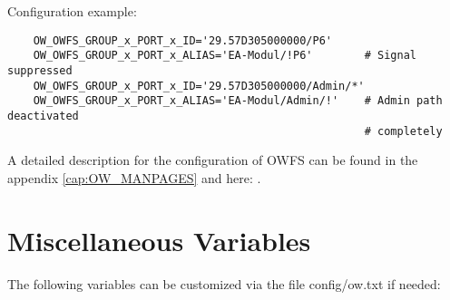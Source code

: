 \begin{description}
Configuration example:
\begin{example}
\begin{verbatim}
    OW_OWFS_GROUP_x_PORT_x_ID='29.57D305000000/P6'
    OW_OWFS_GROUP_x_PORT_x_ALIAS='EA-Modul/!P6'        # Signal suppressed
    OW_OWFS_GROUP_x_PORT_x_ID='29.57D305000000/Admin/*'
    OW_OWFS_GROUP_x_PORT_x_ALIAS='EA-Modul/Admin/!'    # Admin path deactivated
                                                       # completely
\end{verbatim}
\end{example}

A detailed description for the configuration of OWFS can be found in the appendix
\glqq{}\ref{cap:OW_MANPAGES}\grqq{} and here: .

\end{description}

{
\section{Miscellaneous Variables}
}
The following variables can be customized via the file config/ow.txt if needed:

